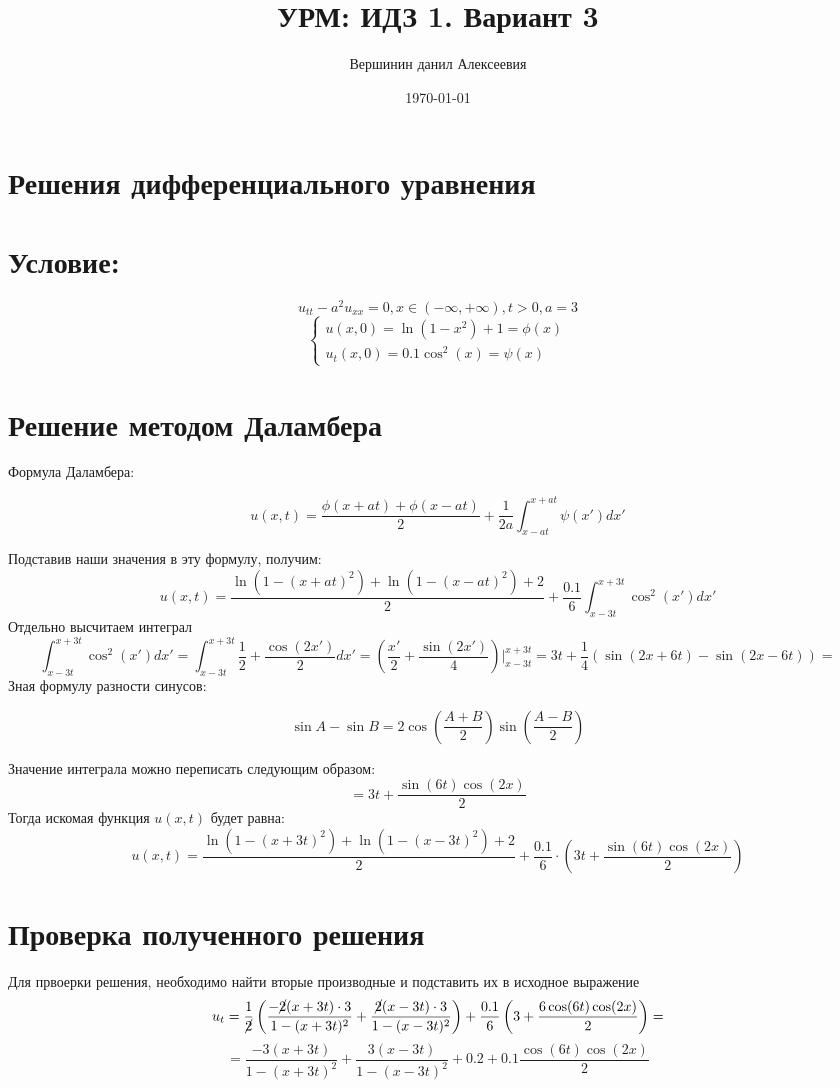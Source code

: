 \documentclass[a4paper,12pt]{article}
\begin{document}
	
	\title{УРМ: ИДЗ 1. Вариант 3}
	\author{Вершинин данил Алексеевия}
	\date{\today}
	\maketitle
	
	\section{Решения дифференциального уравнения}
	\section*{Условие:}
	\[u_{tt} - a^2u_{xx} = 0, x \in (-\infty, +\infty), t > 0, a = 3\]
	\[\begin{cases}
		u(x,0) = \ln(1-x^2) + 1  = \phi(x)\\
		u_t(x,0) = 0.1\cos^2(x) = \psi(x)
	\end{cases}\]
	\section*{Решение методом Даламбера}
	Формула Даламбера:
	\begin{mdframed}
		\[
		u(x,t) = \frac{\phi(x+at) + \phi(x-at)}{2} + \frac{1}{2a}\int_{x-at}^{x+at}\psi(x')dx'
		\]
	\end{mdframed}
	Подставив наши значения в эту формулу, получим:
	\[
		u(x,t) = \frac{\ln(1-(x+at)^2) + \ln(1-(x-at)^2) + 2}{2} + \frac{0.1}{6}\int_{x-3t}^{x+3t} \cos^2(x')dx'
	\]
	Отдельно высчитаем интеграл
	\[
		\int_{x-3t}^{x+3t} \cos^2(x')dx' = \int_{x-3t}^{x+3t} \frac{1}{2} + \frac{\cos(2x')}{2}dx' = \left(\frac{x'}{2} + \frac{\sin(2x')}{4}\right)\bigg|_{x-3t}^{x+3t} = 3t + \frac{1}{4}(\sin(2x + 6t) - \sin(2x-6t))=
	\]
	Зная формулу разности синусов:
	\begin{mdframed}
		\[
		\sin A - \sin B = 2 \cos \left( \frac{A+B}{2} \right) \sin \left( \frac{A-B}{2} \right)
		\]
	\end{mdframed}
	Значение интеграла можно переписать следующим образом:
	\[
		= 3t + \frac{\sin(6t)\cos(2x)}{2}
	\]
	Тогда искомая функция $u(x,t)$ будет равна:
	\[
		u(x,t) =  \frac{\ln(1-(x+3t)^2) + \ln(1-(x-3t)^2) + 2}{2} + \frac{0.1}{6} \cdot \left( 3t + \frac{\sin(6t)\cos(2x)}{2} \right)
	\]
	\section{Проверка полученного решения}
		Для првоерки решения, необходимо найти вторые производные и подставить их в исходное выражение
	\[
		u_t = \frac{1}{\cancel{2}}\left(\frac{-\cancel{2}(x+3t)\cdot3}{1-(x+3t)^2} + \frac{\cancel{2}(x-3t)\cdot3}{1-(x-3t)^2}\right) + 
		\frac{0.1}{6} \left(3 + \frac{6 \cos(6t)\cos(2x)}{2}\right) =
	\]
	\[
	=\frac{-3(x+3t)}{1-(x+3t)^2} + \frac{3(x-3t)}{1-(x-3t)^2} + 
	 0.2 + 0.1\frac{ \cos(6t)\cos(2x)}{2}
	\]
	
\end{document}
